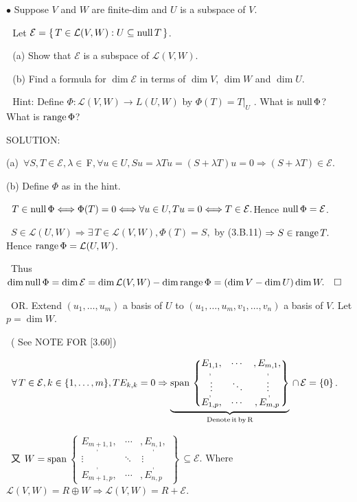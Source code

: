 \documentclass[a4paper, 11pt, UTF8]{article}
\def\range{\textup{range}\,}
\def\null{\textup{null\,}}
\def\Spn{\textup{span}\,}
\def\Lm{\mathcal{L}}
\def\Fbfc{$\,{\timesbf F}$}
\begin{document}
\begin{large}
{\small $\bullet$} {\timessl\Large 
Suppose $V$ and $W$ are finite-dim and $U$ is a subspace of $V$.}\par\,\,
{\timessl\Large Let $\mathcal{E} = \{\,T\in\Lm(V, W): U\subseteq\null T\,\}$.}\par\,\,
(a) {\timessl\Large Show that $\mathcal{E}$ is a subspace of $\Lm(V, W)$.}\par\,\,
(b) {\timessl\Large Find a formula for $\dim \mathcal{E}$ in terms of $\dim V$, $\dim W$ and $\dim U$.}\par\,\,
{\timessl\normalsize
Hint: Define $\Phi:\Lm(V, W)\rightarrow L(U, W)$ by $\Phi(T) = T|_U$ . What is $\null\Phi$?
What is $\range\Phi$?
}\par
{\timesbf S\footnotesize{OLUTION:}}\par\quad
(a) \,$\forall S,T\in\mathcal{E},\lambda\in\Fbfc,\forall u\in U,Su=\lambda Tu=(S+\lambda T)u=0\Rightarrow(S+\lambda T)\in\mathcal{E}.$\par\quad
(b) Define $\Phi$ as in the hint.\par\qquad\,
$T\in\null\Phi\Longleftrightarrow\Phi(T)=0\Longleftrightarrow\forall u\in U,Tu=0\Longleftrightarrow T\in\mathcal{E}.$\qquad\qquad\qquad Hence $\null\Phi=\mathcal{E}$.\par\qquad\,
$S\in\Lm(U,W)\Rightarrow\exists\,T\in\Lm(V,W),\Phi(T)=S,$ by (3.B.11) $\Rightarrow S\in\range T.\,$\quad Hence $\range\Phi=\Lm(U,W)$.\par\qquad\,
Thus $\dim\null\Phi=\dim\mathcal{E}=\dim\Lm(V,W)-\dim\range\Phi=(\dim V-\dim U)\dim W.\quad\square$%
\par\qquad\,
O{\small R}. Extend $(u_1,\dots,u_m)$ a basis of $U$ to $(u_1,\dots,u_m,v_1,\dots,v_n)$ a basis of $V$. Let $p=\dim W$.\par\qquad\,
( See N{\small OTE} F{\small OR} [3.60])\par\qquad\,
$\forall \,T\in\mathcal{E},k\in\{1,\dots,m\},TE_{k,k}=0\Rightarrow\underbrace{\Spn\begin{Bmatrix} \underset{,}{E_{1,1}}, & \cdots & ,\underset{,}{E_{m,1}},\\ \vdots & \ddots & \,\vdots\\ \overset{,}{E_{1,p}}, & \cdots & ,\overset{,}{E_{m,p}}\end{Bmatrix}}_{\textup{Denote\,it\,by\,R}}\,\cap\,\mathcal{E}=\{0\}$.\par\qquad\,
又 $W=\Spn${\footnotesize$\begin{Bmatrix} \underset{,}{E_{m+1,1}}, & \cdots & ,\underset{,}{E_{n,1}},\\ \vdots & \ddots & \,\vdots\\ \overset{,}{E_{m+1,p}}, & \cdots & ,\overset{,}{E_{n,p}}\end{Bmatrix}$}$\,\subseteq\mathcal{E}$. Where $\Lm(V,W)=R\oplus W\Rightarrow\Lm(V,W)=R+\mathcal{E}.$\par\qquad\,

\end{large}
\end{document}
